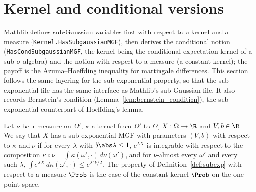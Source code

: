 \section{Kernel and conditional versions}
\label{sec:pre_subexp_kernel}

Mathlib defines sub-Gaussian variables first with respect to a kernel and a measure
(\texttt{Kernel.HasSubgaussianMGF}), then derives the conditional notion
(\texttt{HasCondSubgaussianMGF}, the kernel being the conditional expectation kernel of a
sub-$\sigma$-algebra) and the notion with respect to a measure (a constant kernel); the payoff
is the Azuma--Hoeffding inequality for martingale differences. This section follows the same
layering for the sub-exponential property, so that the sub-exponential file has the same
interface as Mathlib's sub-Gaussian file. It also records Bernstein's condition
(Lemma~\ref{lem:bernstein_condition}), the sub-exponential counterpart of Hoeffding's lemma.

\begin{definition}\label{def:subexp_kernel}
\leanok
{}
Let $\nu$ be a measure on $\Omega'$, $\kappa$ a kernel from $\Omega'$ to $\Omega$,
$X : \Omega \to \R$ and $V, b \in \R$. We say that $X$ has a sub-exponential MGF with
parameters $(V, b)$ with respect to $\kappa$ and $\nu$ if for every $\lambda$ with
$b\abs\lambda \le 1$, $e^{\lambda X}$ is integrable with respect to the composition
$\kappa\circ\nu = \int\kappa(\omega',\cdot)\,d\nu(\omega')$, and for $\nu$-almost every
$\omega'$ and every such $\lambda$,
$\int e^{\lambda X}\,d\kappa(\omega',\cdot) \le e^{\lambda^2V/2}$.
The property of Definition~\ref{def:subexp} with respect to a measure $\Prob$ is the case of
the constant kernel $\Prob$ on the one-point space.
\end{definition}

